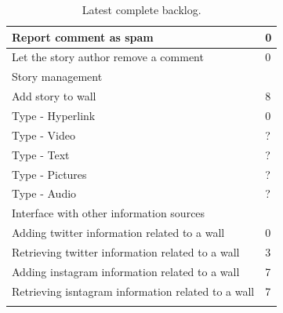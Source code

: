 \documentclass[11pt]{book}
\begin{document}
\begin{center}
\begin{longtable}{| l | l |}
		\hline
		Report comment as spam & 0\\
		\hline
		Let the story author remove a comment	 & 0\\
		\hline
		Story management & \\
		\hline
		Add story to wall & 8\\
		\hline
		Type - Hyperlink & 0\\
		\hline
		Type - Video & ?\\
		\hline
		Type - Text & ?\\
		\hline
		Type - Pictures & ?\\
		\hline
		Type - Audio & ?\\
		\hline
		Interface with other information sources & \\
		\hline
		Adding twitter information related to a wall & 0\\
		\hline
		Retrieving twitter information related to a wall	& 3\\
		\hline
		Adding instagram information related to a wall & 7\\
		\hline
		Retrieving isntagram information related to a wall & 7\\
		\hline
		\caption{Latest complete backlog.}\label{tab:appendix_backlog}
	\end{longtable}
\end{center}
\end{document}
